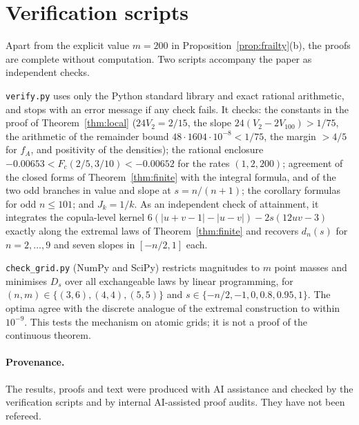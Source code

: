 \documentclass[11pt,a4paper]{article}
\theoremstyle{remark}
\begin{document}
\appendix
\section{Verification scripts}\label{app:scripts}
Apart from the explicit value $m=200$ in Proposition~\ref{prop:frailty}(b), the proofs are complete without computation. Two scripts accompany the paper as independent checks.

\texttt{verify.py} uses only the Python standard library and exact rational arithmetic, and stops with an error message if any check fails. It checks: the constants in the proof of Theorem~\ref{thm:local} ($24V_2=2/15$, the slope $24(V_2-2V_{100})>1/75$, the arithmetic of the remainder bound $48\cdot1604\cdot10^{-8}<1/75$, the margin $>4/5$ for $f_A$, and positivity of the densities); the rational enclosure $-0.00653<F_c(2/5,3/10)<-0.00652$ for the rates $(1,2,200)$; agreement of the closed forms of Theorem~\ref{thm:finite} with the integral formula, and of the two odd branches in value and slope at $s=n/(n+1)$; the corollary formulas for odd $n\leq101$; and $J_k=1/k$. As an independent check of attainment, it integrates the copula-level kernel $6(|u+v-1|-|u-v|)-2s(12uv-3)$ exactly along the extremal laws of Theorem~\ref{thm:finite} and recovers $d_n(s)$ for $n=2,\ldots,9$ and seven slopes in $[-n/2,1]$ each.

\texttt{check\_grid.py} (NumPy and SciPy) restricts magnitudes to $m$ point masses and minimises $D_s$ over all exchangeable laws by linear programming, for $(n,m)\in\{(3,6),(4,4),(5,5)\}$ and $s\in\{-n/2,-1,0,0.8,0.95,1\}$. The optima agree with the discrete analogue of the extremal construction to within $10^{-9}$. This tests the mechanism on atomic grids; it is not a proof of the continuous theorem.

\paragraph{Provenance.} The results, proofs and text were produced with AI assistance and checked by the verification scripts and by internal AI-assisted proof audits. They have not been refereed.
\end{document}
